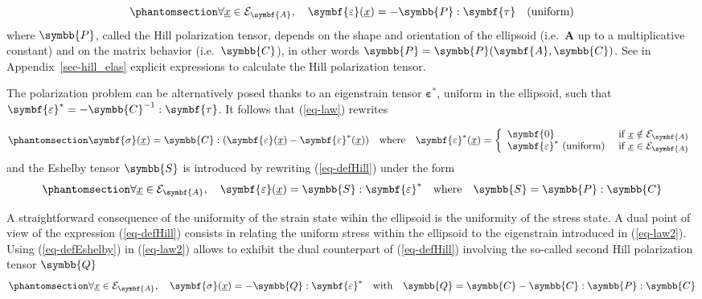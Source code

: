 \documentclass[
  a4paper,
  numbers=noendperiod,
  DIV=12]{scrreprt}
\newcommand{\uu}[1]{{\symbf{{#1}}}}
\newcommand{\uuuu}[1]{{\symbb{{#1}}}}
\newcommand{\uv}[1]{{\underline{{#1}}}}
\newcommand{\x}{{\uv{{x}}}}
\newcommand{\eps}{{\uu{{\varepsilon}}}}
\newcommand{\sig}{{\uu{{\sigma}}}}
\begin{document}
\begin{equation}\protect\phantomsection\label{eq-defHill}{
   \forall \x \in \mathcal{E}_{\uu{A}},\quad \eps(\x)=-\uuuu{P}:\uu{\tau}\quad\textrm{(uniform)}
}\end{equation} where \(\uuuu{P}\), called the Hill polarization tensor,
depends on the shape and orientation of the ellipsoid (i.e.~\(\uu{A}\)
up to a multiplicative constant) and on the matrix behavior
(i.e.~\(\uuuu{C}\)), in other words
\(\uuuu{P}=\uuuu{P}(\uu{A},\uuuu{C})\). See in
Appendix~\ref{sec-hill_elas} explicit expressions to calculate the Hill
polarization tensor.

The polarization problem can be alternatively posed thanks to an
eigenstrain tensor \(\eps^*\), uniform in the ellipsoid, such that
\(\eps^*=-\uuuu{C}^{-1}:\uu{\tau}\). It follows that (\ref{eq-law})
rewrites

\begin{equation}\protect\phantomsection\label{eq-law2}{
    \sig(\x)=\uuuu{C}:(\eps(\x)-\eps^*(\x))\quad\textrm{where}\quad
    \eps^*(\x)=
    \left\{
    \begin{array}{ll}
    \uu{0}&\textrm{ if }\x \notin \mathcal{E}_{\uu{A}}\\
    \eps^*\textrm{ (uniform)}&\textrm{ if }\x \in \mathcal{E}_{\uu{A}}
    \end{array}
    \right.
}\end{equation} and the Eshelby tensor \(\uuuu{S}\) is introduced by
rewriting (\ref{eq-defHill}) under the form
\begin{equation}\protect\phantomsection\label{eq-defEshelby}{
   \forall \x \in \mathcal{E}_{\uu{A}},\quad \eps(\x)=\uuuu{S}:\eps^*\quad\textrm{where}\quad\uuuu{S}=\uuuu{P}:\uuuu{C}
}\end{equation}

A straightforward consequence of the uniformity of the strain state
wihin the ellipsoid is the uniformity of the stress state. A dual point
of view of the expression (\ref{eq-defHill}) consists in relating the
uniform stress within the ellipsoid to the eigenstrain introduced in
(\ref{eq-law2}). Using (\ref{eq-defEshelby}) in (\ref{eq-law2}) allows
to exhibit the dual counterpart of (\ref{eq-defHill}) involving the
so-called second Hill polarization tensor \(\uuuu{Q}\)
\begin{equation}\protect\phantomsection\label{eq-defsecondHill}{
   \forall \x \in \mathcal{E}_{\uu{A}},\quad \sig(\x)=-\uuuu{Q}:\eps^*\quad\textrm{with}\quad\uuuu{Q}=\uuuu{C}-\uuuu{C}:\uuuu{P}:\uuuu{C}
}\end{equation}
\end{document}

